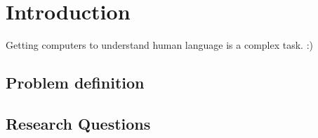 \chapter{Introduction}

Getting computers to understand human language is a complex task. :)

\section{Problem definition}


\section{Research Questions}

